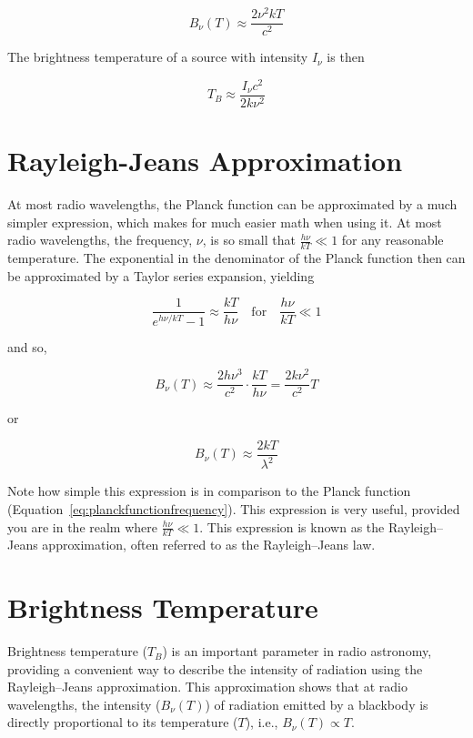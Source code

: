\[
B_\nu(T) \approx \frac{2\nu^2 kT}{c^2}
\]

The brightness temperature of a source with intensity \(I_\nu\) is then

\[
T_B \approx \frac{I_\nu c^2}{2k\nu^2}
\]

\section{Rayleigh-Jeans Approximation}

At most radio wavelengths, the Planck function can be approximated by a much simpler expression, which makes for much easier math when using it. At most radio wavelengths, the frequency, $\nu$, is so small that $\frac{h \nu}{k T} \ll 1$ for any reasonable temperature. The exponential in the denominator of the Planck function then can be approximated by a Taylor series expansion, yielding

\begin{equation}
\frac{1}{e^{h\nu/kT} - 1} \approx \frac{kT}{h\nu} \quad \text{for} \quad \frac{h\nu}{kT} \ll 1
\label{eq:taylor}
\end{equation}

and so,

\begin{equation}
B_\nu (T) \approx \frac{2h\nu^3}{c^2} \cdot \frac{kT}{h\nu} = \frac{2k\nu^2}{c^2} T
\label{eq:rayleigh_jeans_freq}
\end{equation}

or

\begin{equation}
B_\nu (T) \approx \frac{2kT}{\lambda^2}
\label{eq:rayleigh_jeans_wave}
\end{equation}

Note how simple this expression is in comparison to the Planck function (Equation~\eqref{eq:planckfunctionfrequency}). This expression is very useful, provided you are in the realm where $\frac{h \nu}{k T} \ll 1$. This expression is known as the Rayleigh--Jeans approximation, often referred to as the Rayleigh--Jeans law.

\clearpage

\section{Brightness Temperature}

Brightness temperature (\( T_B \)) is an important parameter in radio astronomy, providing a convenient way to describe the intensity of radiation using the Rayleigh–Jeans approximation. This approximation shows that at radio wavelengths, the intensity (\( B_\nu(T) \)) of radiation emitted by a blackbody is directly proportional to its temperature (\( T \)), i.e., \( B_\nu(T) \propto T \). \\

